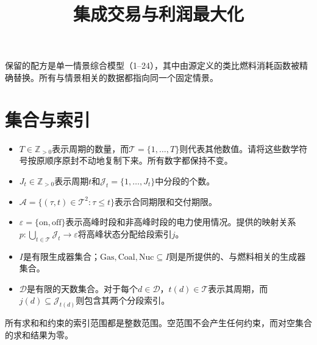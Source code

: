 \documentclass[11pt,a4paper]{article}
\title{集成交易与利润最大化}
\author{}
\date{}
\begin{document}
\maketitle

保留的配方是单一情景综合模型（1–24），其中由源定义的类比燃料消耗函数被精确替换。所有与情景相关的数据都指向同一个固定情景。

\section*{集合与索引}
\begin{itemize}
\item $T\in\mathbb Z_{>0}$表示周期的数量，而$\mathcal T=\{1,\ldots,T\}$则代表其他数值。请将这些数学符号按原顺序原封不动地复制下来。所有数字都保持不变。
\item $J_t\in\mathbb Z_{>0}$表示周期$t$和$\mathcal J_t=\{1,\ldots,J_t\}$中分段的个数。
\item $\mathcal A=\{(\tau,t)\in\mathcal T^2:\tau\le t\}$表示合同期限和交付期限。
\item $\varepsilon=\{\mathrm{on},\mathrm{off}\}$表示高峰时段和非高峰时段的电力使用情况。提供的映射关系$p:\bigcup_{t\in\mathcal T}\mathcal J_t\to\varepsilon$将高峰状态分配给段索引$j$。
\item $I$是有限生成器集合；$\mathrm{Gas},\mathrm{Coal},\mathrm{Nuc}\subseteq I$则是所提供的、与燃料相关的生成器集合。
\item $\mathcal D$是有限的天数集合。对于每个$d\in\mathcal D$，$t(d)\in\mathcal T$表示其周期，而$j(d)\subseteq\mathcal J_{t(d)}$则包含其两个分段索引。
\end{itemize}
所有求和和约束的索引范围都是整数范围。空范围不会产生任何约束，而对空集合的求和结果为零。
\end{document}
